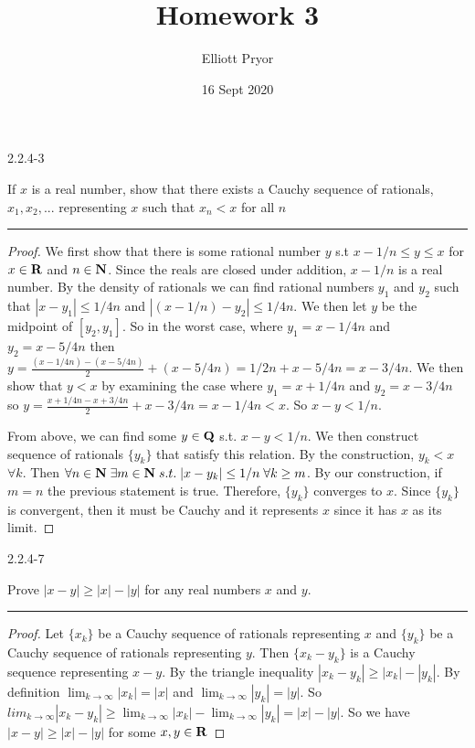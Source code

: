 \documentclass[11pt]{article}
\title{Homework 3}
\author{Elliott Pryor}
\date{16 Sept 2020}
\begin{document}
\maketitle



 2.2.4-3

If $x$ is a real number, show that there exists a Cauchy sequence of rationals, $x_1, x_2, ...$ representing $x$ such that $x_n < x$ for all $n$
\hrule

\begin{proof}


We first show that there is some rational number $y$ s.t $x-1/n \leq y \leq x$ for $x \in \mathbf{R}$ and $n \in \mathbf{N}$. Since the reals are closed under addition, $x - 1/n$ is a real number. By the density of rationals we can find rational numbers $y_1$ and $y_2$ such that $|x - y_1| \leq 1/4n$ and $|(x-1/n) - y_2| \leq 1/4n$. We then let $y$ be the midpoint of $[y_2, y_1]$.  So in the worst case, where $y_1 = x - 1/4n$ and $y_2 = x - 5/4n$ then $y = \frac{(x - 1/4n) - (x - 5/4n)}{2} + (x - 5/4n) = 1/2n + x - 5/4n = x - 3/4n$. 
We then show that $y < x$ by examining the case where $y_1 = x + 1/4n$ and $y_2 = x - 3/4n$ so $y = \frac{x + 1/4n - x + 3/4n}{2} +  x - 3/4n = x - 1/4n < x$.
So $x - y < 1/n$.

From above, we can find some $y \in \mathbf{Q}$ s.t. $x - y < 1/n$. We then construct sequence of rationals $\{y_k\}$ that satisfy this relation. By the construction, $y_k < x$ $\forall k$. Then $\forall n \in \mathbf{N} \; \exists m \in \mathbf{N} \; s.t. \; |x - y_k| \leq 1/n \; \forall k \geq m$. By our construction, if $m = n$ the previous statement is true. Therefore, $\{y_k\}$ converges to $x$. Since $\{y_k\}$ is convergent, then it must be Cauchy and it represents $x$ since it has $x$ as its limit.
\end{proof}



 2.2.4-7

Prove $|x-y| \geq |x| - |y|$ for any real numbers $x$ and $y$.
\hrule


\begin{proof}

Let $\{x_k\}$ be a Cauchy sequence of rationals representing $x$ and $\{y_k\}$ be a Cauchy sequence of rationals representing $y$. Then $\{x_k - y_k\}$ is a Cauchy sequence representing $x - y$. By the triangle inequality $|x_k - y_k| \geq |x_k| - |y_k|$. By definition $\lim_{k \to \infty} |x_k| = |x|$ and $\lim_{k \to \infty} |y_k| = |y|$. So $lim_{k \to \infty} |x_k - y_k| \geq \lim_{k \to \infty} |x_k| - \lim_{k \to \infty} |y_k| = |x| - |y|$. So we have $|x - y| \geq |x| - |y|$ for some $x,y \in \mathbf{R}$

\end{proof}
\end{document}
